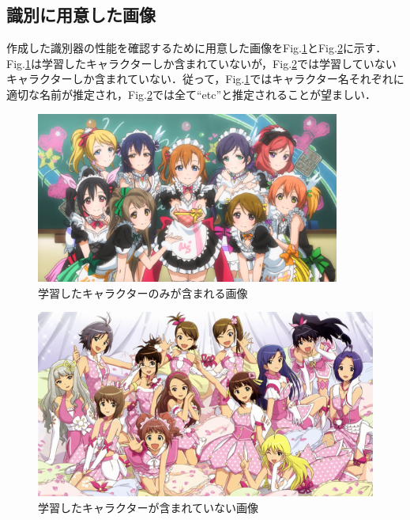 \documentclass[a4paper,10pt]{jsarticle}
\begin{document}
\subsection{識別に用意した画像}
作成した識別器の性能を確認するために用意した画像をFig.\ref{224542_17Jul15}とFig.\ref{224550_17Jul15}に示す．Fig.\ref{224542_17Jul15}は学習したキャラクターしか含まれていないが，Fig.\ref{224550_17Jul15}では学習していないキャラクターしか含まれていない．従って，Fig.\ref{224542_17Jul15}ではキャラクター名それぞれに適切な名前が推定され，Fig.\ref{224550_17Jul15}では全て``etc''と推定されることが望ましい．
\begin{figure}[ht]
 \centering
 \includegraphics[width=100mm, bb = 0 0 1920 1080]{fig/jpg/lovelive.jpg}
 \caption{学習したキャラクターのみが含まれる画像 }
 \label{224542_17Jul15}
\end{figure}
\begin{figure}[ht]
 \centering
 \includegraphics[scale=1.0]{fig/jpg/idolmaster.jpg}
 \caption{学習したキャラクターが含まれていない画像 }
 \label{224550_17Jul15}
\end{figure}
\end{document}
